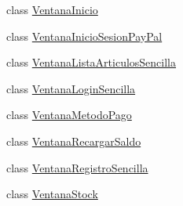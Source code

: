 \begin{DoxyCompactItemize}
\item 
class \mbox{\hyperlink{classes_1_1deusto_1_1client_1_1gui_1_1_ventana_inicio}{Ventana\+Inicio}}
\item 
class \mbox{\hyperlink{classes_1_1deusto_1_1client_1_1gui_1_1_ventana_inicio_sesion_pay_pal}{Ventana\+Inicio\+Sesion\+Pay\+Pal}}
\item 
class \mbox{\hyperlink{classes_1_1deusto_1_1client_1_1gui_1_1_ventana_lista_articulos_sencilla}{Ventana\+Lista\+Articulos\+Sencilla}}
\item 
class \mbox{\hyperlink{classes_1_1deusto_1_1client_1_1gui_1_1_ventana_login_sencilla}{Ventana\+Login\+Sencilla}}
\item 
class \mbox{\hyperlink{classes_1_1deusto_1_1client_1_1gui_1_1_ventana_metodo_pago}{Ventana\+Metodo\+Pago}}
\item 
class \mbox{\hyperlink{classes_1_1deusto_1_1client_1_1gui_1_1_ventana_recargar_saldo}{Ventana\+Recargar\+Saldo}}
\item 
class \mbox{\hyperlink{classes_1_1deusto_1_1client_1_1gui_1_1_ventana_registro_sencilla}{Ventana\+Registro\+Sencilla}}
\item 
class \mbox{\hyperlink{classes_1_1deusto_1_1client_1_1gui_1_1_ventana_stock}{Ventana\+Stock}}
\end{DoxyCompactItemize}
